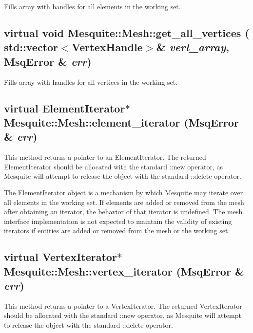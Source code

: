 Fills array with handles for all elements in the working set.


\subsection{\setlength{\rightskip}{0pt plus 5cm}virtual void Mesquite::Mesh::get\_\-all\_\-vertices (
std::vector$<$VertexHandle$>$\& {\em vert\_\-array}, {\bf Msq\-Error} \& {\em err})\hspace{0.3cm}{\tt  [pure virtual]}}\label{classMesquite_1_1Mesh_a3}

Fills array with handles for all vertices in the working set.

\subsection{\setlength{\rightskip}{0pt plus 5cm}virtual Element\-Iterator$\ast$ Mesquite::Mesh::element\_\-iterator ({\bf Msq\-Error} \& {\em err})\hspace{0.3cm}{\tt  [pure virtual]}}\label{classMesquite_1_1Mesh_a6}

This method returns a pointer to an ElementIterator.  The returned ElementIterator should be allocated with the standard ::new operator, as 
Mesquite will attempt to release the object with the standard ::delete operator.

The ElementIterator object is a mechanism by which Mesquite may iterate over all elements in the working set.  If elements are added or removed from the mesh after obtaining an iterator, the behavior of that iterator is undefined.  The mesh interface implementation is not expected to maintain the validity of existing iterators if entities are added or
removed from the mesh or the working set.

\subsection{\setlength{\rightskip}{0pt plus 5cm}virtual Vertex\-Iterator$\ast$ Mesquite::Mesh::vertex\_\-iterator ({\bf Msq\-Error} \& {\em err})\hspace{0.3cm}{\tt  [pure virtual]}}\label{classMesquite_1_1Mesh_a5}

This method returns a pointer to a VertexIterator.  The returned VertexIterator should be allocated with the standard ::new operator, as 
Mesquite will attempt to release the object with the standard ::delete operator.

